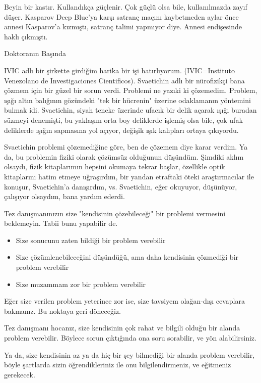 \documentclass[12pt,fleqn]{article}\usepackage{../../common}
\begin{document}
Beyin bir kastır. Kullandıkça güçlenir. Çok güçlü olsa bile, kullanılmazda
zayıf düşer. Kasparov Deep Blue'ya karşı satranç maçını kaybetmeden aylar
önce annesi Kasparov'a kızmıştı, satranç talimi yapmıyor diye. Annesi
endişesinde haklı çıkmıştı.

Doktoranın Başında

IVIC adlı bir şirkette girdiğim harika bir işi
hatırlıyorum. (IVIC=Instituto Venezolano de Investigaciones
Cientificos). Svaetichin adlı bir nürofizikçi bana çözmem için bir güzel
bir sorun verdi. Problemi ne yazıki ki çözemedim. Problem, ışığı altın
balığının gözündeki "tek bir hücrenin" üzerine odaklamanın yöntemini bulmak
idi. Svaetichin, siyah teneke üzerinde ufacık bir delik açarak ışığı
buradan süzmeyi denemişti, bu yaklaşım orta boy deliklerde işlemiş olsa
bile, çok ufak deliklerde ışığın sapmasına yol açıyor, değişik ışık
kalıpları ortaya çıkıyordu.

Svaetichin problemi çözemediğine göre, ben de çözemem diye karar verdim. Ya
da, bu problemin fiziki olarak çözümsüz olduğunun düşündüm. Şimdiki aklım
olsaydı, fizik kitaplarımın hepsini okumaya tekrar başlar, özellikle optik
kitaplarını hatim etmeye uğraşırdım, bir yandan etraftaki öteki
araştırmacılar ile konuşur, Svaetichin'a danışırdım, vs. Svaetichin, eğer
okuyuyor, düşünüyor, çalışıyor olsaydım, bana yardım ederdi.

Tez danışmanınızın size "kendisinin çözebileceği" bir problemi vermesini
beklemeyin. Tabii bunu yapabilir de.

\begin{itemize}
   \item Size sonucunu zaten bildiği bir problem verebilir
   \item Size çözümlenebileceğini düşündüğü, ama daha kendisinin çözmediği
     bir problem verebilir
   \item Size muzammam zor bir problem verebilir
\end{itemize}

Eğer size verilen problem yeterince zor ise, size tavsiyem olağan-dışı
cevaplara bakmanız. Bu noktaya geri döneceğiz.

Tez danışmanı hocanız, size kendisinin çok rahat ve bilgili olduğu bir
alanda problem verebilir. Böylece sorun çıktığında ona soru sorabilir, ve
yön alabilirsiniz.

Ya da, size kendisinin az ya da hiç bir şey bilmediği bir alanda problem
verebilir, böyle şartlarda sizin öğrendikleriniz ile onu bilgilendirmeniz,
ve eğitmeniz gerekecek.
\end{document}
